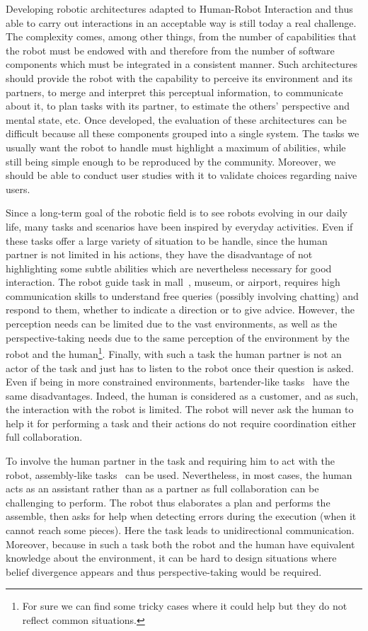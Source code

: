 \documentclass[a4paper,11pt,twoside]{StyleThese}
\begin{document}
Developing robotic architectures adapted to Human-Robot Interaction and thus able to carry out interactions in an acceptable way is still today a real challenge. The complexity comes, among other things, from the number of capabilities that the robot must be endowed with and therefore from the number of software components which must be integrated in a consistent manner. Such architectures should provide the robot with the capability to perceive its environment and its partners, to merge and interpret this perceptual information, to communicate about it, to plan tasks with its partner, to estimate the others' perspective and mental state, etc. Once developed, the evaluation of these architectures can be difficult because all these components grouped into a single system. The tasks we usually want the robot to handle must highlight a maximum of abilities, while still being simple enough to be reproduced by the community. Moreover, we should be able to conduct user studies with it to validate choices regarding naive users.

Since a long-term goal of the robotic field is to see robots evolving in our daily life, many tasks and scenarios have been inspired by everyday activities. Even if these tasks offer a large variety of situation to be handle, since the human partner is not limited in his actions, they have the disadvantage of not highlighting some subtle abilities which are nevertheless necessary for good interaction.
The robot guide task in mall~\citep{satake_2015_should}, museum, or airport, requires high communication skills to understand free queries (possibly involving chatting) and respond to them, whether to indicate a direction or to give advice. However, the perception needs can be limited due to the vast environments, as well as the perspective-taking needs due to the same perception of the environment by the robot and the human\footnote{For sure we can find some tricky cases where it could help but they do not reflect common situations.}. Finally, with such a task the human partner is not an actor of the task and just has to listen to the robot once their question is asked. Even if being in more constrained environments, bartender-like tasks~\citep{petrick_2012_social} have the same disadvantages. Indeed, the human is considered as a customer, and as such, the interaction with the robot is limited. The robot will never ask the human to help it for performing a task and their actions do not require coordination either full collaboration.

To involve the human partner in the task and requiring him to act with the robot, assembly-like tasks~\citep{tellex_2014_asking} can be used. Nevertheless, in most cases, the human acts as an assistant rather than as a partner as full collaboration can be challenging to perform. The robot thus elaborates a plan and performs the assemble, then asks for help when detecting errors during the execution (\eg when it cannot reach some pieces). Here the task leads to unidirectional communication. Moreover, because in such a task both the robot and the human have equivalent knowledge about the environment, it can be hard to design situations where belief divergence appears and thus perspective-taking would be required.
\end{document}

